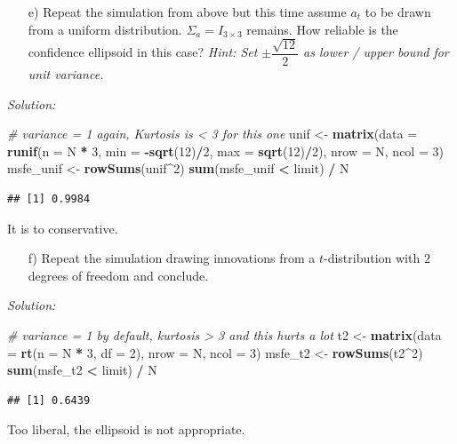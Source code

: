 \documentclass[12pt,a4paper]{article}
\newenvironment{Shaded}{\begin{snugshade}}{\end{snugshade}}
\newcommand{\CommentTok}[1]{\textcolor[rgb]{0.56,0.35,0.01}{\textit{#1}}}
\newcommand{\DataTypeTok}[1]{\textcolor[rgb]{0.13,0.29,0.53}{#1}}
\newcommand{\DecValTok}[1]{\textcolor[rgb]{0.00,0.00,0.81}{#1}}
\newcommand{\KeywordTok}[1]{\textcolor[rgb]{0.13,0.29,0.53}{\textbf{#1}}}
\newcommand{\NormalTok}[1]{#1}
\newcommand{\OperatorTok}[1]{\textcolor[rgb]{0.81,0.36,0.00}{\textbf{#1}}}
\newcommand{\StringTok}[1]{\textcolor[rgb]{0.31,0.60,0.02}{#1}}
\begin{document}
\begin{itemize}
  \item[e)] Repeat the simulation from above but this time assume $a_t$ to be drawn from a uniform distribution. $\Sigma_a = I_{3 \times 3}$ remains. How reliable is the confidence ellipsoid in this case? 
  \textit{Hint: Set $\pm \dfrac{\sqrt{12}}{2}$ as lower / upper bound for unit variance.}
\end{itemize}

\emph{Solution:}

\begin{Shaded}
\begin{Highlighting}[]
\CommentTok{# variance = 1 again, Kurtosis is < 3 for this one}
\NormalTok{unif <-}\StringTok{ }\KeywordTok{matrix}\NormalTok{(}\DataTypeTok{data =} \KeywordTok{runif}\NormalTok{(}\DataTypeTok{n =}\NormalTok{ N }\OperatorTok{*}\StringTok{ }\DecValTok{3}\NormalTok{, }\DataTypeTok{min =} \OperatorTok{-}\KeywordTok{sqrt}\NormalTok{(}\DecValTok{12}\NormalTok{)}\OperatorTok{/}\DecValTok{2}\NormalTok{, }
                            \DataTypeTok{max =} \KeywordTok{sqrt}\NormalTok{(}\DecValTok{12}\NormalTok{)}\OperatorTok{/}\DecValTok{2}\NormalTok{), }\DataTypeTok{nrow =}\NormalTok{ N, }\DataTypeTok{ncol =} \DecValTok{3}\NormalTok{) }
\NormalTok{msfe_unif <-}\StringTok{ }\KeywordTok{rowSums}\NormalTok{(unif}\OperatorTok{^}\DecValTok{2}\NormalTok{)}
\KeywordTok{sum}\NormalTok{(msfe_unif }\OperatorTok{<}\StringTok{ }\NormalTok{limit) }\OperatorTok{/}\StringTok{ }\NormalTok{N}
\end{Highlighting}
\end{Shaded}

\begin{verbatim}
## [1] 0.9984
\end{verbatim}

It is to conservative.

\begin{itemize}
  \item[f)] Repeat the simulation drawing innovations from a $t$-distribution with $2$ degrees of freedom and conclude.
\end{itemize}

\emph{Solution:}

\begin{Shaded}
\begin{Highlighting}[]
\CommentTok{# variance = 1 by default, kurtosis > 3 and this hurts a lot}
\NormalTok{t2 <-}\StringTok{ }\KeywordTok{matrix}\NormalTok{(}\DataTypeTok{data =} \KeywordTok{rt}\NormalTok{(}\DataTypeTok{n =}\NormalTok{ N }\OperatorTok{*}\StringTok{ }\DecValTok{3}\NormalTok{, }\DataTypeTok{df =} \DecValTok{2}\NormalTok{), }\DataTypeTok{nrow =}\NormalTok{ N, }\DataTypeTok{ncol =} \DecValTok{3}\NormalTok{)}
\NormalTok{msfe_t2 <-}\StringTok{ }\KeywordTok{rowSums}\NormalTok{(t2}\OperatorTok{^}\DecValTok{2}\NormalTok{)}
\KeywordTok{sum}\NormalTok{(msfe_t2 }\OperatorTok{<}\StringTok{ }\NormalTok{limit) }\OperatorTok{/}\StringTok{ }\NormalTok{N}
\end{Highlighting}
\end{Shaded}

\begin{verbatim}
## [1] 0.6439
\end{verbatim}

Too liberal, the ellipsoid is not appropriate.
\end{document}

